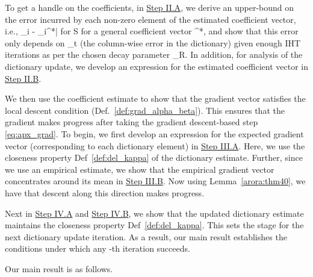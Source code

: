 \documentclass{article}
\def\[#1\]{{$#1$}}
\def\b#1{{\mathbf{#1}}}
\begin{document}
To get a handle on the coefficients, in \hyperref[Step II.A]{Step II.A}, we derive an upper-bound on the error incurred by each non-zero element of the estimated coefficient vector, i.e., \[|\hat{\b{x}}_{i} - \b{x}_{i}^*|\] for \[i \in S\] for a general coefficient vector \[\b{x}^*\], and show that this error only depends on \[\epsilon_t\] (the column-wise error in the dictionary) given enough IHT iterations \[R\] as per the chosen decay parameter \[\delta_R\]. In addition, for analysis of the dictionary update, we develop an expression for the estimated coefficient vector in \hyperref[Step II.B]{Step II.B}.

We then use the coefficient estimate to show that the gradient vector satisfies the local descent condition (Def.~\ref{def:grad_alpha_beta}). This ensures that the gradient makes progress after taking the gradient descent-based step \eqref{eq:apx_grad}. To begin, we first develop an expression for the expected gradient vector (corresponding to each dictionary element) in \hyperref[Step III.A]{Step III.A}. Here, we use the closeness property Def~\ref{def:del_kappa} of the dictionary estimate. Further, since we use an empirical estimate, we show that the empirical gradient vector concentrates around its mean in \hyperref[Step III.B]{Step III.B}. Now using Lemma~\ref{arora:thm40}, we have that descent along this direction makes progress. 

Next in \hyperref[Step IV.A]{Step IV.A} and \hyperref[Step IV.B]{Step IV.B}, we show that the updated dictionary estimate maintains the closeness property Def~\ref{def:del_kappa}. This sets the stage for the next dictionary update iteration. As a result, our main result establishes the conditions under which any \[t\]-th iteration succeeds. 

Our main result is as follows.
\end{document}
